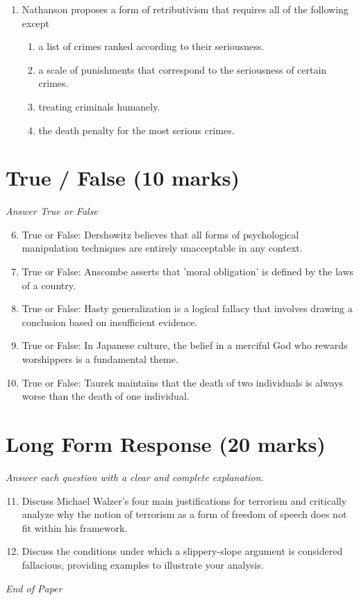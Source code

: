 \documentclass[12pt]{article}
\begin{document}
\begin{enumerate}[label=\arabic*.]
\begin{enumerate}[label=(\alph*)]
    \item descriptive use.
    \item inferential use.
    \item propositional use.
    \item expressive use.
\end{enumerate}
\item Nathanson proposes a form of retributivism that requires all of the following except
\begin{enumerate}[label=(\alph*)]
    \item a list of crimes ranked according to their seriousness.
    \item a scale of punishments that correspond to the seriousness of certain crimes.
    \item treating criminals humanely.
    \item the death penalty for the most serious crimes.
\end{enumerate}
\end{enumerate}

\section*{True / False (10 marks)}
\textit{Answer True or False}
\begin{enumerate}[label=\arabic*.]
\setcounter{enumi}{5}
\item True or False: Dershowitz believes that all forms of psychological manipulation techniques are entirely unacceptable in any context.
\item True or False: Anscombe asserts that 'moral obligation' is defined by the laws of a country.
\item True or False: Hasty generalization is a logical fallacy that involves drawing a conclusion based on insufficient evidence.
\item True or False: In Japanese culture, the belief in a merciful God who rewards worshippers is a fundamental theme.
\item True or False: Taurek maintains that the death of two individuals is always worse than the death of one individual.
\end{enumerate}

\section*{Long Form Response (20 marks)}
\textit{Answer each question with a clear and complete explanation.}
\begin{enumerate}[label=\arabic*.]
\setcounter{enumi}{10}
\item Discuss Michael Walzer's four main justifications for terrorism and critically analyze why the notion of terrorism as a form of freedom of speech does not fit within his framework.
\item Discuss the conditions under which a slippery-slope argument is considered fallacious, providing examples to illustrate your analysis.
\end{enumerate}

\vfill
\noindent\textit{End of Paper}
\end{document}
